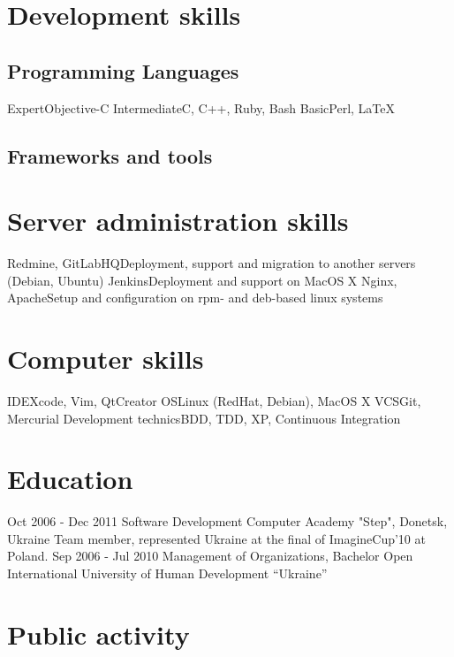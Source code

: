 \documentclass[11pt,a4paper]{moderncv}
\begin{document}
\section{Development skills}
\subsection{Programming Languages}
\cvline
  {Expert}{Objective-C}
\cvline
  {Intermediate}{C, C++, Ruby, Bash}
\cvline
  {Basic}{Perl, LaTeX}
\subsection{Frameworks and tools}

\section{Server administration skills}
\cvline
  {Redmine, GitLabHQ}{Deployment, support and migration to another servers (Debian, Ubuntu)}
\cvline
  {Jenkins}{Deployment and support on MacOS X}
\cvline
  {Nginx, Apache}{Setup and configuration on rpm- and deb-based linux systems}

\section{Computer skills}
  \cvline
  {IDE}{Xcode, Vim, QtCreator}
  \cvline
  {OS}{Linux (RedHat, Debian), MacOS X}
  \cvline
  {VCS}{Git, Mercurial}
  \cvline
  {Development technics}{BDD, TDD, XP, Continuous Integration}

\section{Education}
  \cventry
    {Oct 2006 - Dec 2011}
    {Software Development}
    {Computer Academy "Step", Donetsk, Ukraine}
    {}{}
    {Team member, represented Ukraine at the final of ImagineCup'10 at Poland.}
  \cventry
    {Sep 2006 - Jul 2010}
    {Management of Organizations, Bachelor}
    {Open International University of Human Development “Ukraine”}
    {}{}{}

\section{Public activity}
\end{document}
